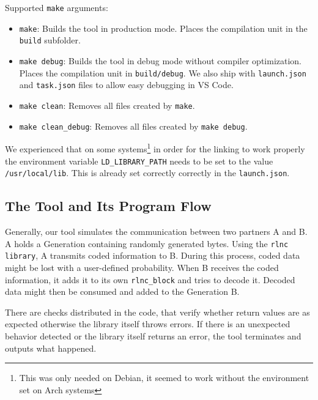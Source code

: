 \documentclass[a4paper,english,10pt]{tumarticle}
\begin{document}
Supported \texttt{make} arguments:
\begin{itemize}
  \item \texttt{make}: Builds the tool in production mode. Places the compilation unit in the \texttt{build} subfolder.
  \item \texttt{make debug}: Builds the tool in debug mode without compiler optimization. Places the compilation unit in \texttt{build/debug}. We also ship with \texttt{launch.json} and \texttt{task.json} files to allow easy debugging in VS Code.
  \item \texttt{make clean}: Removes all files created by \texttt{make}.
  \item \texttt{make clean\_debug}: Removes all files created by \texttt{make debug}.
\end{itemize}

We experienced that on some systems\footnote{This was only needed on Debian, it seemed to work without the environment set on Arch systems} in order for the linking to work properly the environment variable \texttt{LD\_LIBRARY\_PATH} needs to be set to the value \texttt{/usr/local/lib}. This is already set correctly correctly in the \texttt{launch.json}.



\subsection{The Tool and Its Program Flow}\label{sec:tool}
Generally, our tool simulates the communication between two partners A and B. 
A holds a Generation containing randomly generated bytes. Using the \texttt{rlnc library}, A transmits coded information to B. 
During this process, coded data might be lost with a user-defined probability. When B receives the coded information, 
it adds it to its own \texttt{rlnc\_block} and tries to decode it. Decoded data might then be consumed and added to the Generation B.

There are checks distributed in the code, that verify whether return values are as expected otherwise 
the library itself throws errors. If there is an unexpected behavior detected or the library itself returns an error, 
the tool terminates and outputs what happened.
\end{document}
